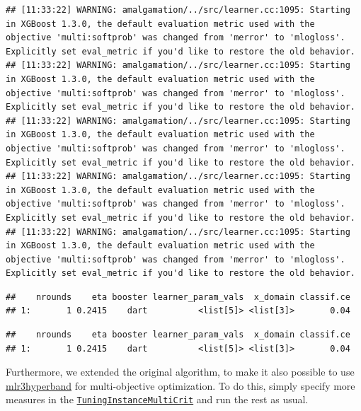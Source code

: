 \documentclass[
]{scrbook}
\newenvironment{Shaded}{\begin{snugshade}}{\end{snugshade}}
\newcommand{\NormalTok}[1]{#1}
\newcommand{\SpecialCharTok}[1]{\textcolor[rgb]{0.00,0.00,0.00}{#1}}
\renewenvironment{Shaded} {\begin{snugshade}\small} {\end{snugshade}}
\begin{document}
\begin{verbatim}
## [11:33:22] WARNING: amalgamation/../src/learner.cc:1095: Starting in XGBoost 1.3.0, the default evaluation metric used with the objective 'multi:softprob' was changed from 'merror' to 'mlogloss'. Explicitly set eval_metric if you'd like to restore the old behavior.
## [11:33:22] WARNING: amalgamation/../src/learner.cc:1095: Starting in XGBoost 1.3.0, the default evaluation metric used with the objective 'multi:softprob' was changed from 'merror' to 'mlogloss'. Explicitly set eval_metric if you'd like to restore the old behavior.
## [11:33:22] WARNING: amalgamation/../src/learner.cc:1095: Starting in XGBoost 1.3.0, the default evaluation metric used with the objective 'multi:softprob' was changed from 'merror' to 'mlogloss'. Explicitly set eval_metric if you'd like to restore the old behavior.
## [11:33:22] WARNING: amalgamation/../src/learner.cc:1095: Starting in XGBoost 1.3.0, the default evaluation metric used with the objective 'multi:softprob' was changed from 'merror' to 'mlogloss'. Explicitly set eval_metric if you'd like to restore the old behavior.
## [11:33:22] WARNING: amalgamation/../src/learner.cc:1095: Starting in XGBoost 1.3.0, the default evaluation metric used with the objective 'multi:softprob' was changed from 'merror' to 'mlogloss'. Explicitly set eval_metric if you'd like to restore the old behavior.
\end{verbatim}

\begin{verbatim}
##    nrounds    eta booster learner_param_vals  x_domain classif.ce
## 1:       1 0.2415    dart          <list[5]> <list[3]>       0.04
\end{verbatim}

\begin{Shaded}
\end{Shaded}

\begin{verbatim}
##    nrounds    eta booster learner_param_vals  x_domain classif.ce
## 1:       1 0.2415    dart          <list[5]> <list[3]>       0.04
\end{verbatim}

Furthermore, we extended the original algorithm, to make it also possible to use \href{https://mlr3hyperband.mlr-org.com}{mlr3hyperband} for multi-objective optimization.
To do this, simply specify more measures in the \href{https://mlr3tuning.mlr-org.com/reference/TuningInstanceMultiCrit.html}{\texttt{TuningInstanceMultiCrit}} and run the rest as usual.
\end{document}
